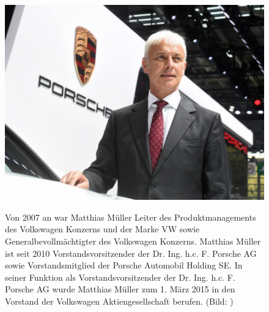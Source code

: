 \documentclass[12pt]{article}
\begin{document}
\begin{figure}[!h]
	\centering
	\begin{minipage}[h]{0.20\textwidth}
		\centering
		\includegraphics[width=1.0\textwidth]{images/MathiasMueller.jpg}
		\label{fig:vorstandvw4}
	\end{minipage}
	\begin{minipage}[h]{0.10\textwidth}
		\hspace{1cm} 
	\end{minipage}
	\begin{minipage}[h]{0.65\textwidth}
		Von 2007 an war Matthias Müller Leiter des Produktmanagements des Volkswagen Konzerns und der Marke VW sowie Generalbevollmächtigter des Volkswagen Konzerns. Matthias Müller ist seit 2010 Vorstandsvorsitzender der Dr. Ing. h.c. F. Porsche AG sowie Vorstandsmitglied der Porsche Automobil Holding SE.
		In seiner Funktion als Vorstandsvorsitzender der Dr. Ing. h.c. F. Porsche AG wurde Matthias Müller zum 1. März 2015 in den Vorstand der Volkswagen Aktiengesellschaft berufen. (Bild: \cite{mmpic} )
	\end{minipage}
\end{figure}
\end{document}
